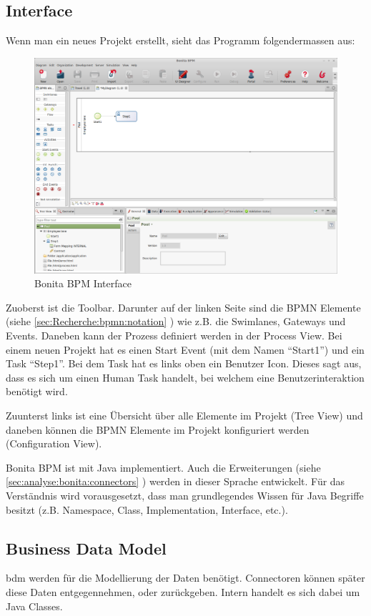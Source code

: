 \subsection{Interface}
Wenn man ein neues Projekt erstellt, sieht das Programm folgendermassen aus:
\begin{figure}[H]
	\centering
	\includegraphics[width=1\textwidth]{images/bonita.png}
	\caption{Bonita BPM Interface}
	\label{fig:analyse:bonita:interface}
\end{figure}
Zuoberst ist die Toolbar. Darunter auf der linken Seite sind die BPMN Elemente (siehe \cref{sec:Recherche:bpmn:notation} ) wie z.B. die Swimlanes, Gateways und Events. Daneben kann der Prozess definiert werden in der Process View. Bei einem neuen Projekt hat es einen Start Event (mit dem Namen "`Start1"') und ein Task "`Step1"'. Bei dem Task hat es links oben ein Benutzer Icon. Dieses sagt aus, dass es sich um einen Human Task handelt, bei welchem eine Benutzerinteraktion benötigt wird.

Zuunterst links ist eine Übersicht über alle Elemente im Projekt (Tree View) und daneben können die BPMN Elemente im Projekt konfiguriert werden (Configuration View).

Bonita BPM ist mit Java implementiert. Auch die Erweiterungen (siehe \cref{sec:analyse:bonita:connectors} ) werden in dieser Sprache entwickelt. Für das Verständnis wird vorausgesetzt, dass man grundlegendes Wissen für Java Begriffe besitzt (z.B. Namespace, Class, Implementation, Interface, etc.).

\subsection{Business Data Model}
\gls{bdm} werden für die Modellierung der Daten benötigt. Connectoren können später diese Daten entgegennehmen, oder zurückgeben. Intern handelt es sich dabei um Java Classes.

